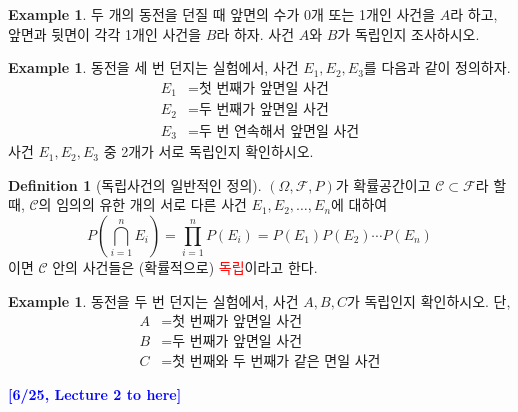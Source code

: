 \documentclass{article}
\theoremstyle{definition}
\newtheorem{definition}[theorem]{Definition}
\newtheorem{example}[theorem]{Example}
\begin{document}
\begin{example}
    두 개의 동전을 던질 때 앞면의 수가 0개 또는 1개인 사건을 $A$라 하고, 앞면과 뒷면이 각각 1개인 사건을 $B$라 하자. 사건 $A$와 $B$가 독립인지 조사하시오.
\end{example}

\begin{example}
    동전을 세 번 던지는 실험에서, 사건 $E_1, E_2, E_3$를 다음과 같이 정의하자.
\begin{align*}
E_1 &= \text{첫 번째가 앞면일 사건} \\
E_2 &= \text{두 번째가 앞면일 사건} \\
E_3 &= \text{두 번 연속해서 앞면일 사건}
\end{align*}
사건 $E_1, E_2, E_3$ 중 2개가 서로 독립인지 확인하시오.
\end{example}

\newpage

\begin{definition}[독립사건의 일반적인 정의]
    $(\Omega, \mathcal{F}, P)$가 확률공간이고 $\mathcal{C} \subset \mathcal{F}$라 할 때, $\mathcal{C}$의 임의의 유한 개의 서로 다른 사건 $E_1, E_2, \dots, E_n$에 대하여
    \begin{equation*}
        P\left( \bigcap_{i=1}^{n} E_i \right) = \prod_{i=1}^{n} P(E_i) = P(E_1) P(E_2) \cdots P(E_n)
    \end{equation*}
    이면 $\mathcal{C}$ 안의 사건들은 (확률적으로) \textcolor{red}{독립}이라고 한다.
\end{definition}

\begin{example}
    동전을 두 번 던지는 실험에서, 사건 $A, B, C$가 독립인지 확인하시오. 단,
\begin{align*}
A &= \text{첫 번째가 앞면일 사건} \\
B &= \text{두 번째가 앞면일 사건} \\
C &= \text{첫 번째와 두 번째가 같은 면일 사건}
\end{align*}
\end{example}

\noindent
\textcolor{blue}{\textbf{[6/25, Lecture 2 to here]}}
\end{document}
